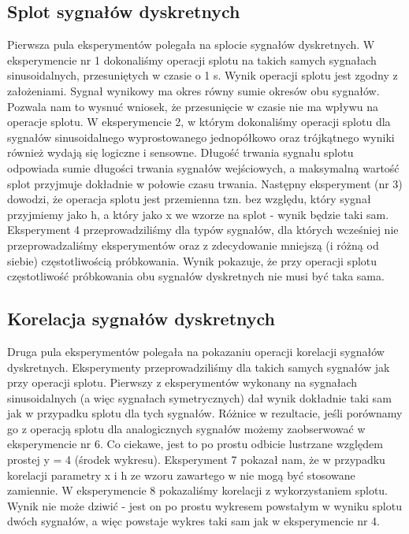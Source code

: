 \documentclass[12pt]{article}
\begin{document}
\subsection{Splot sygnałów dyskretnych}
Pierwsza pula eksperymentów polegała na splocie sygnałów dyskretnych. W eksperymencie nr 1 dokonaliśmy operacji splotu na takich samych sygnałach sinusoidalnych, przesuniętych w czasie o 1 s. Wynik operacji splotu jest zgodny z założeniami. Sygnał wynikowy ma okres równy sumie okresów obu sygnałów. Pozwala nam to wysnuć wniosek, że przesunięcie w czasie nie ma wpływu na operacje splotu. W eksperymencie 2, w którym dokonaliśmy operacji splotu dla sygnałów sinusoidalnego wyprostowanego jednopółkowo oraz trójkątnego wyniki również wydają się logiczne i sensowne. Długość trwania sygnału splotu odpowiada sumie długości trwania sygnałów wejściowych, a maksymalną wartość splot przyjmuje dokładnie w połowie czasu trwania. Następny eksperyment (nr 3) dowodzi, że operacja splotu jest przemienna tzn. bez względu, który sygnał przyjmiemy jako h, a który jako x we wzorze na splot \cite{instrukcja} - wynik będzie taki sam. Eksperyment 4 przeprowadziliśmy dla typów sygnałów, dla których wcześniej nie przeprowadzaliśmy eksperymentów oraz z zdecydowanie mniejszą (i różną od siebie) częstotliwością próbkowania. Wynik pokazuje, że przy operacji splotu częstotliwość próbkowania obu sygnałów dyskretnych nie musi być taka sama.

\subsection{Korelacja sygnałów dyskretnych}
Druga pula eksperymentów polegała na pokazaniu operacji korelacji sygnałów dyskretnych. Eksperymenty przeprowadziliśmy dla takich samych sygnałów jak przy operacji splotu. Pierwszy z eksperymentów wykonany na sygnałach sinusoidalnych (a więc sygnałach symetrycznych) dał wynik dokładnie taki sam jak w przypadku splotu dla tych sygnałów. Różnice w rezultacie, jeśli porównamy go z operacją splotu dla analogicznych sygnałów możemy zaobserwować w eksperymencie nr 6. Co ciekawe, jest to po prostu odbicie lustrzane względem prostej y = 4 (środek wykresu). Eksperyment 7 pokazał nam, że w przypadku korelacji parametry x i h ze wzoru zawartego w \cite{instrukcja} nie mogą być stosowane zamiennie. W eksperymencie 8 pokazaliśmy korelacji z wykorzystaniem splotu. Wynik nie może dziwić - jest on po prostu wykresem powstałym w wyniku splotu dwóch sygnałów, a więc powstaje wykres taki sam jak w eksperymencie nr 4. 
\end{document}
